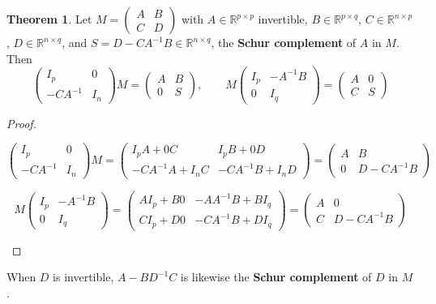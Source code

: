 \documentclass[12pt]{article}
\newcommand{\R}{\mathbb R}
\newcommand{\C}{\mathbb C}
\theoremstyle{definition}
\newtheorem{theorem}{Theorem}
\begin{document}
\begin{theorem}\label{b5.9}\label{b5.8}
Let \(M=\begin{pmatrix}A&B\\C&D\end{pmatrix}\) with \(A\in\R^{p\times p}\) invertible, \(B\in\R^{p\times q}\),
\(C\in\R^{n\times p}\), \(D\in\R^{n\times q}\), and \(S=D-CA^{-1}B\in\R^{n\times q}\), the \textbf{Schur complement} of
\(A\) in \(M\). Then
\[
\begin{pmatrix}I_p&0\\-CA^{-1}&I_n\end{pmatrix}M=\begin{pmatrix}A&B\\0&S\end{pmatrix},\qquad
M\begin{pmatrix}I_p&-A^{-1}B\\0&I_q\end{pmatrix}=\begin{pmatrix}A&0\\C&S\end{pmatrix}
\]
\end{theorem}
\begin{proof}
\begin{board}
\[
\begin{pmatrix}I_p&0\\-CA^{-1}&I_n\end{pmatrix}M
=\begin{pmatrix}I_pA+0C&I_pB+0D\\-CA^{-1}A+I_nC&-CA^{-1}B+I_nD\end{pmatrix}=\begin{pmatrix}A&B\\0&D-CA^{-1}B\end{pmatrix}
\]
\end{board}
\begin{board}
\[
M\begin{pmatrix}I_p&-A^{-1}B\\0&I_q\end{pmatrix}
=\begin{pmatrix}AI_p+B0&-AA^{-1}B+BI_q\\CI_p+D0&-CA^{-1}B+DI_q\end{pmatrix}=\begin{pmatrix}A&0\\C&D-CA^{-1}B\end{pmatrix}
\]
\end{board}
\nopagebreak
\end{proof}
When \(D\) is invertible, \(A-BD^{-1}C\) is likewise the \textbf{Schur complement} of \(D\) in \(M\).
\end{document}

